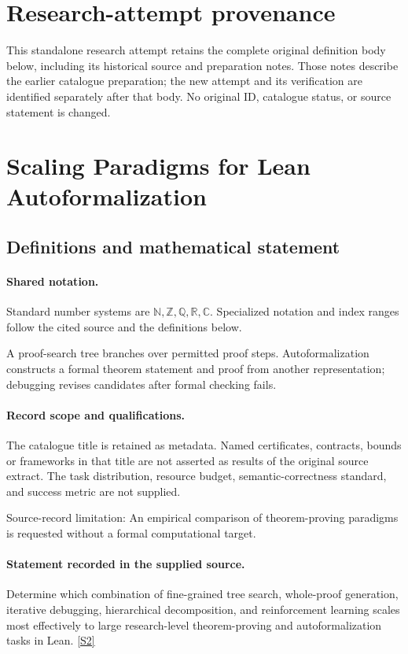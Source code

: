 \documentclass[11pt]{article}
\begin{document}
\section*{Research-attempt provenance}
This standalone research attempt retains the complete original definition body below,
including its historical source and preparation notes. Those notes describe the
earlier catalogue preparation; the new attempt and its verification are identified
separately after that body. No original ID, catalogue status, or source statement is changed.

\section{Scaling Paradigms for Lean Autoformalization}\label{statement}

\subsection{Definitions and mathematical statement}

\paragraph{Shared notation.}Standard number systems are $\mathbb N,\mathbb Z,\mathbb Q,\mathbb R,\mathbb C$. Specialized notation and index ranges follow the cited source and the definitions below.


A proof-search tree branches over permitted proof steps. Autoformalization constructs a formal theorem statement and proof from another representation; debugging revises candidates after formal checking fails.
\paragraph{Record scope and qualifications.}
The catalogue title is retained as metadata. Named certificates, contracts, bounds or frameworks in that title are not asserted as results of the original source extract.
The task distribution, resource budget, semantic-correctness standard, and success metric are not supplied.

Source-record limitation: An empirical comparison of theorem-proving paradigms is requested without a formal computational target.
\paragraph{Statement recorded in the supplied source.}
Determine which combination of fine-grained tree search, whole-proof generation, iterative debugging, hierarchical decomposition, and reinforcement learning scales most effectively to large research-level theorem-proving and autoformalization tasks in Lean. \href{https://doi.org/10.4171/owr/2025/43}{[S2]}
\end{document}
